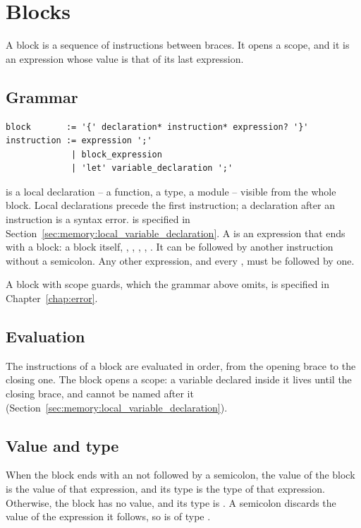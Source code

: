 \vfill%
\pagebreak
\section{Blocks}
\label{sec:flow:blocks}

A block is a sequence of instructions between braces. It opens a scope, and it
is an expression whose value is that of its last expression.

\subsection{Grammar}

\begin{lstlisting}[style=grammarVerb]
block       := '{' declaration* instruction* expression? '}'
instruction := expression ';'
             | block_expression
             | 'let' variable_declaration ';'
\end{lstlisting}

 is a local declaration -- a function, a type, a module --
visible from the whole block. Local declarations precede the first instruction;
a declaration after an instruction is a syntax error. is specified in
Section~\ref{sec:memory:local_variable_declaration}. A
 is an expression that ends with a block: a block
itself, , , , ,
. It can be followed by another instruction without a semicolon.
Any other expression, and every , must be followed by one.

A block with scope guards, which the grammar above omits, is specified in
Chapter~\ref{chap:error}.

\subsection{Evaluation}

The instructions of a block are evaluated in order, from the opening brace to
the closing one. The block opens a scope: a variable declared inside it lives
until the closing brace, and cannot be named after it
(Section~\ref{sec:memory:local_variable_declaration}).

\subsection{Value and type}

When the block ends with an  not followed by a semicolon, the
value of the block is the value of that expression, and its type is the type of
that expression. Otherwise, the block has no value, and its type is
. A semicolon discards the value of the expression it follows, so
 is of type .

